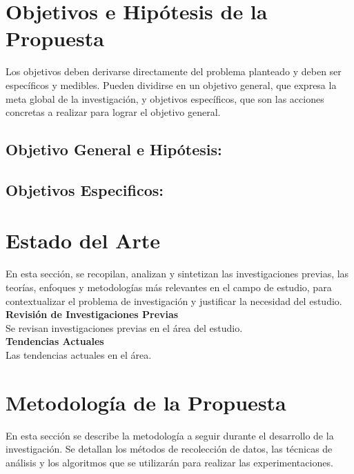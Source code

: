 \documentclass[a4paper,12pt]{article}
\begin{document}
	
	\section{Objetivos e Hipótesis de la Propuesta}
	
	Los objetivos deben derivarse directamente del problema planteado y deben ser específicos y medibles. Pueden dividirse en un objetivo general, que expresa la meta global de la investigación, y objetivos específicos, que son las acciones concretas a realizar para lograr el objetivo general.%
	
	
\subsection{Objetivo General e Hipótesis:} 
	
\vspace{2cm}
\subsection{Objetivos Especificos:}


	
	\newpage
	
\section{\textbf{Estado del Arte}}
	En esta sección, se recopilan, analizan y sintetizan las investigaciones previas, las teorías, enfoques y metodologías más relevantes en el campo de estudio, para contextualizar el problema de investigación y justificar la necesidad del estudio. \cite{referencia2} \\
	\textbf{{Revisión de Investigaciones Previas}} \\
	Se revisan investigaciones previas en el área del estudio. \\
	\textbf{{Tendencias Actuales}}\\
	Las tendencias actuales en el área.
	 		
	
	\newpage
	
	\section{Metodología de la Propuesta}
	En esta sección se describe la metodología a seguir durante el desarrollo de la investigación. Se detallan los métodos de recolección de datos, las técnicas de análisis y los algoritmos que se utilizarán para realizar las experimentaciones.
	\cite{simpson2019largeannotatedmedicalimage}
	
\end{document}
